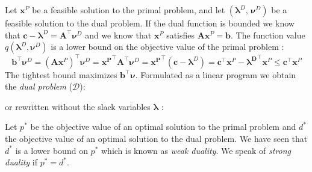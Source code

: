 Let $\mathbf x^P$ be a feasible solution to the primal problem, and let $(\boldsymbol \lambda^D, \, \boldsymbol \nu^D)$ be a feasible solution to the dual problem. If the dual function is bounded we know that $\mathbf c - \boldsymbol \lambda^D = \mathbf A^\intercal \boldsymbol \nu^D$ and we know that $\mathbf x^P$ satisfies $ \mathbf A\mathbf x^P = \mathbf b$. The function value $q(\boldsymbol \lambda^D, \boldsymbol \nu^D)$ is a lower bound on the objective value of the primal problem \cite{aps_mosek_nodate}: 
\begin{equation*}
    \mathbf b^\intercal \boldsymbol \nu^D
    = (\mathbf A \mathbf x^P)^\intercal \boldsymbol \nu^D 
    = \mathbf {x^P}^\intercal \mathbf A^\intercal \boldsymbol \nu^D 
    = \mathbf {x^P}^\intercal (\mathbf c - \boldsymbol \lambda^D) 
    = \mathbf c^\intercal \mathbf x^P  - \boldsymbol {\lambda^D}^\intercal \mathbf x^P
    \leq \mathbf c^\intercal \mathbf x^P
\end{equation*}
The tightest bound maximizes $\mathbf b^\intercal \boldsymbol \nu$. Formulated as a linear program we obtain the \textit{dual problem} ($\mathcal{D}$):
or rewritten without the slack variables $\boldsymbol \lambda$ \cite{noauthor_numerical_2006}:
Let $p^*$ be the objective value of an optimal solution to the primal problem and $d^*$ the objective value of an optimal solution to the dual problem. We have seen that $d^*$ is a lower bound on $p^*$ which is known as \textit{weak duality}. We speak of \textit{strong duality} if $p^*=d^*$. 

